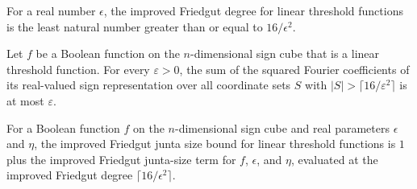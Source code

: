 \begin{definition}
\label{FABL.ltfImprovedFriedgutDegree}
\leanok
For a real number $\epsilon$, the improved Friedgut degree for linear threshold
functions is the least natural number greater than or equal to $16/\epsilon^2$.
\end{definition}

\begin{theorem}
\label{FABL.ltf_spectrum_concentrated_up_to_improvedFriedgutDegree}
\leanok
{}
Let $f$ be a Boolean function on the $n$-dimensional sign cube that is a linear
threshold function. For every $\varepsilon>0$, the sum of the squared Fourier
coefficients of its real-valued sign representation over all coordinate sets $S$ with
$|S|>\lceil16/\varepsilon^2\rceil$ is at most $\varepsilon$.
\end{theorem}

\begin{definition}
\label{FABL.ltfImprovedFriedgutJuntaSizeBound}
\leanok
{}
For a Boolean function $f$ on the $n$-dimensional sign cube and real parameters
$\epsilon$ and $\eta$, the improved Friedgut junta size bound for linear threshold
functions is $1$ plus the improved Friedgut junta-size term for $f$, $\epsilon$, and
$\eta$, evaluated at the improved Friedgut degree $\lceil16/\epsilon^2\rceil$.
\end{definition}

